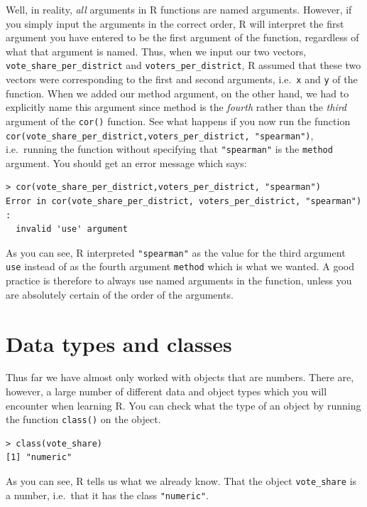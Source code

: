 \documentclass[
]{book}
\begin{document}
Well, in reality, \emph{all} arguments in R functions are named arguments. However, if you simply input the arguments in the correct order, R will interpret the first argument you have entered to be the first argument of the function, regardless of what that argument is named. Thus, when we input our two vectors, \texttt{vote\_share\_per\_district} and \texttt{voters\_per\_district}, R assumed that these two vectors were corresponding to the first and second arguments, i.e.~\texttt{x} and \texttt{y} of the function. When we added our method argument, on the other hand, we had to explicitly name this argument since method is the \emph{fourth} rather than the \emph{third} argument of the \texttt{cor()} function. See what happens if you now run the function \texttt{cor(vote\_share\_per\_district,voters\_per\_district,\ "spearman")}, i.e.~running the function without specifying that \texttt{"spearman"} is the \texttt{method} argument. You should get an error message which says:

\begin{verbatim}
> cor(vote_share_per_district,voters_per_district, "spearman")
Error in cor(vote_share_per_district, voters_per_district, "spearman") : 
  invalid 'use' argument
\end{verbatim}

As you can see, R interpreted \texttt{"spearman"} as the value for the third argument \texttt{use} instead of as the fourth argument \texttt{method} which is what we wanted. A good practice is therefore to always use named arguments in the function, unless you are absolutely certain of the order of the arguments.

\hypertarget{data-types-and-classes}{%
\section{Data types and classes}\label{data-types-and-classes}}

Thus far we have almost only worked with objects that are numbers. There are, however, a large number of different data and object types which you will encounter when learning R. You can check what the type of an object by running the function \texttt{class()} on the object.

\begin{verbatim}
> class(vote_share)
[1] "numeric"
\end{verbatim}

As you can see, R tells us what we already know. That the object \texttt{vote\_share} is a number, i.e.~that it has the class \texttt{"numeric"}.
\end{document}
